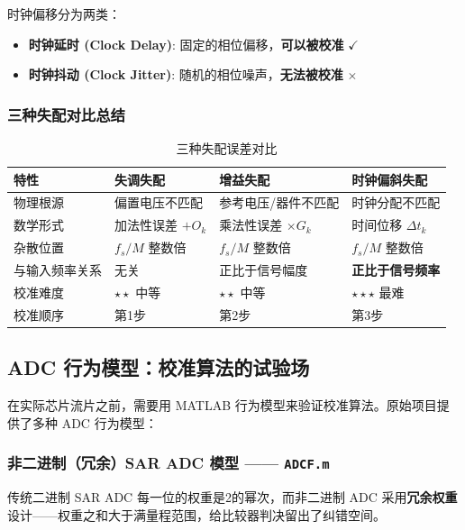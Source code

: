 \documentclass[UTF8,a4paper,11pt]{ctexart}
\begin{document}
时钟偏移分为两类：
\begin{itemize}
    \item \textbf{时钟延时 (Clock Delay)}: 固定的相位偏移，\textbf{可以被校准} $\checkmark$
    \item \textbf{时钟抖动 (Clock Jitter)}: 随机的相位噪声，\textbf{无法被校准} $\times$
\end{itemize}

\subsubsection{三种失配对比总结}

\begin{table}[ht]
\centering
\caption{三种失配误差对比}
\begin{tabular}{p{2.5cm}p{2.8cm}p{2.8cm}p{3cm}}
\toprule
\textbf{特性} & \textbf{失调失配} & \textbf{增益失配} & \textbf{时钟偏斜失配} \\
\midrule
物理根源 & 偏置电压不匹配 & 参考电压/器件不匹配 & 时钟分配不匹配 \\
数学形式 & 加法性误差 $+O_k$ & 乘法性误差 $\times G_k$ & 时间位移 $\Delta t_k$ \\
杂散位置 & $f_s/M$ 整数倍 & $f_s/M$ 整数倍 & $f_s/M$ 整数倍 \\
与输入频率关系 & 无关 & 正比于信号幅度 & \textbf{正比于信号频率} \\
校准难度 & $\star\star$ 中等 & $\star\star$ 中等 & $\star\star\star$ 最难 \\
校准顺序 & 第1步 & 第2步 & 第3步 \\
\bottomrule
\end{tabular}
\end{table}

\subsection{ADC 行为模型：校准算法的试验场}
\label{sec:behavioral}

在实际芯片流片之前，需要用 MATLAB 行为模型来验证校准算法。原始项目提供了多种 ADC 行为模型：

\subsubsection{非二进制（冗余）SAR ADC 模型 —— \texttt{ADCF.m}}

传统二进制 SAR ADC 每一位的权重是2的幂次，而非二进制 ADC 采用\textbf{冗余权重}设计——权重之和大于满量程范围，给比较器判决留出了纠错空间。
\end{document}
